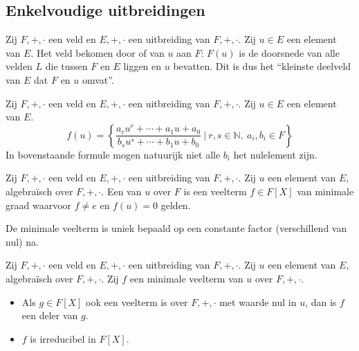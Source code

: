 \documentclass[main.tex]{subfiles}
\begin{document}
\subsection{Enkelvoudige uitbreidingen}
\label{sec:enkelv-uitbr}

\begin{de}
  Zij $F,+,\cdot$ een veld en $E,+,\cdot$ een uitbreiding van $F,+,\cdot$.
  Zij $u\in E$ een element van $E$.
  Het veld bekomen door  of  van $u$ aan $F$: $F(u)$ is de doorsnede van alle velden $L$ die tussen $F$ en $E$ liggen en $u$ bevatten.
  Dit is dus het ``kleinste deelveld van $E$ dat $F$ en $u$ omvat''.
\end{de}

\begin{ei}
  Zij $F,+,\cdot$ een veld en $E,+,\cdot$ een uitbreiding van $F,+,\cdot$.
  Zij $u\in E$ een element van $E$.
  \[
  f(u) = 
  \left\{
      \frac
        {a_{r}u^{r} + \dotsb + a_{1} u + a_{0}}
        {b_{s}u^{s} + \dotsb + b_{1} u + b_{0}}
  \ |\ r,s \in \mathbb{N},\ a_{i},b_{i} \in F
  \right\}
  \]
  In bovenstaande formule mogen natuurijk niet alle $b_{i}$ het nulelement zijn.
\end{ei}

\begin{de}
  Zij $F,+,\cdot$ een veld en $E,+,\cdot$ een uitbreiding van $F,+,\cdot$.
  Zij $u$ een element van $E$, algebra\"isch over $F,+,\cdot$.
  Een  van $u$ over $F$ is een veelterm $f\in F[X]$ van minimale graad waarvoor $f\neq e$ en $f(u) = 0$ gelden.
\end{de}

\begin{pr}
  De minimale veelterm is uniek bepaald op een constante factor (verschillend van nul) na.
\end{pr}

\begin{ei}
  Zij $F,+,\cdot$ een veld en $E,+,\cdot$ een uitbreiding van $F,+,\cdot$.
  Zij $u$ een element van $E$, algebra\"isch over $F,+,\cdot$.
  Zij $f$ een minimale veelterm van $u$ over $F,+,\cdot$.
  \begin{itemize}
  \item Als $g \in F[X]$ ook een veelterm is over $F,+,\cdot$ met waarde nul in $u$, dan is $f$ een deler van $g$.
  \item $f$ is irreducibel in $F[X]$.
  \end{itemize}
\end{ei}
\end{document}
